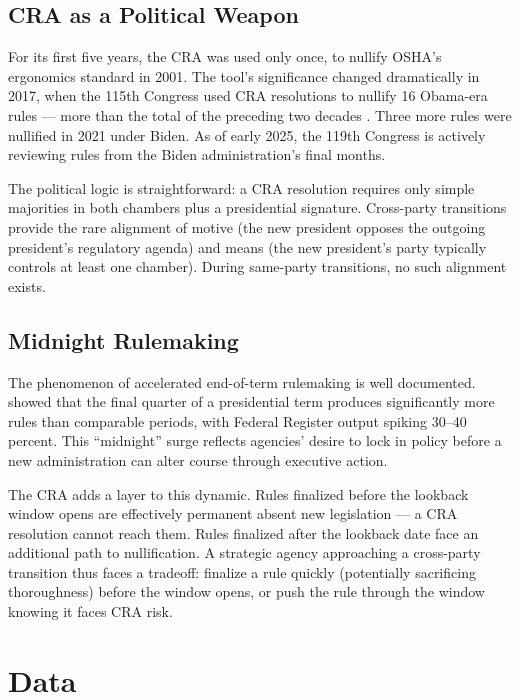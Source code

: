 \documentclass[12pt]{article}
\begin{document}
\subsection{CRA as a Political Weapon}

For its first five years, the CRA was used only once, to nullify OSHA's ergonomics standard in 2001. The tool's significance changed dramatically in 2017, when the 115th Congress used CRA resolutions to nullify 16 Obama-era rules --- more than the total of the preceding two decades \citep{beermann2012}. Three more rules were nullified in 2021 under Biden. As of early 2025, the 119th Congress is actively reviewing rules from the Biden administration's final months.

The political logic is straightforward: a CRA resolution requires only simple majorities in both chambers plus a presidential signature. Cross-party transitions provide the rare alignment of motive (the new president opposes the outgoing president's regulatory agenda) and means (the new president's party typically controls at least one chamber). During same-party transitions, no such alignment exists.

\subsection{Midnight Rulemaking}

The phenomenon of accelerated end-of-term rulemaking is well documented. \citet{oconnell2008} showed that the final quarter of a presidential term produces significantly more rules than comparable periods, with Federal Register output spiking 30--40 percent. This ``midnight'' surge reflects agencies' desire to lock in policy before a new administration can alter course through executive action.

The CRA adds a layer to this dynamic. Rules finalized before the lookback window opens are effectively permanent absent new legislation --- a CRA resolution cannot reach them. Rules finalized after the lookback date face an additional path to nullification. A strategic agency approaching a cross-party transition thus faces a tradeoff: finalize a rule quickly (potentially sacrificing thoroughness) before the window opens, or push the rule through the window knowing it faces CRA risk.


\section{Data}
\end{document}
